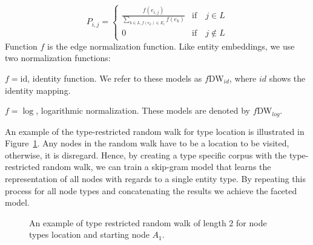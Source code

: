 \begin{equation}
P_{ i,j }=\left\{ 
\begin{matrix}
 \frac { f(e_{ i,j }) }{ \sum _{ k\in L,f(e_{ k })\in E_{ i } }^{  }{ f(e_{ k }) }  }  & \mathrm{if}\quad j\in L \\
0 & \mathrm{if}\quad j\notin L
\end{matrix} 
\right. 
\label{eq:transition_type_restricted}
\end{equation} 
\noindent
Function $f$ is the edge normalization function. Like entity embeddings, we use two normalization functions: \\
\begin{inparaenum}
\item  $f=\mathrm{id}$, identity function. We refer to these models as $f$DW$_{id}$, where $id$ shows the identity mapping. \\
\item  $f=\log$, logarithmic normalization. These models are denoted by  $f$DW$_{log}$.\\
\end{inparaenum}
\noindent
An example of the type-restricted random walk for type location is illustrated in Figure~\ref{fig:facetteddeepwalk}. Any nodes in the random walk have to be a location to be visited, otherwise, it is disregard. Hence, by creating a type specific corpus with the type-restricted random walk, we can train a skip-gram model that learns the representation of all nodes with regards to a single entity type. By repeating this process for all node types and concatenating the results we achieve the faceted model.
\begin{figure}
\centering 
\resizebox{0.60\textwidth}{0.27\textwidth}{      

}
\caption{An example of type restricted random walk of length $2$ for node types location and starting node $A_1$.}
\label{fig:facetteddeepwalk}
\end{figure} 
